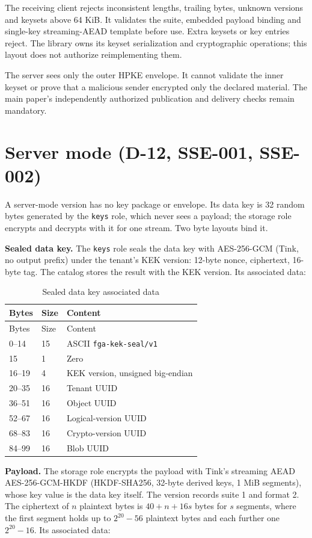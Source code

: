 \documentclass[11pt,a4paper]{article}
\newcommand{\code}[1]{{\small\nolinkurl{#1}}}
\begin{document}
The receiving client rejects inconsistent lengths, trailing bytes, unknown
versions and keysets above 64 KiB. It validates the suite, embedded payload
binding and single-key streaming-AEAD template before use. Extra keysets or key
entries reject. The library owns its keyset serialization and cryptographic
operations; this layout does not authorize reimplementing them.

The server sees only the outer HPKE envelope. It cannot validate the inner
keyset or prove that a malicious sender encrypted only the declared material.
The main paper's independently authorized publication and delivery checks
remain mandatory.

\section*{Server mode (D-12, SSE-001, SSE-002)}
A server-mode version has no key package or envelope. Its data key is 32
random bytes generated by the \code{keys} role, which never sees a payload;
the storage role encrypts and decrypts with it for one stream. Two byte
layouts bind it.

\textbf{Sealed data key.} The \code{keys} role seals the data key with
AES-256-GCM (Tink, no output prefix) under the tenant's KEK version: 12-byte
nonce, ciphertext, 16-byte tag. The catalog stores the result with the KEK
version. Its associated data:

\begin{longtable}{@{}P{0.15\textwidth}P{0.20\textwidth}P{0.55\textwidth}@{}}
\caption{Sealed data key associated data}\label{tab:sealaad}\\
\toprule Bytes & Size & Content\\\midrule\endfirsthead
\toprule Bytes & Size & Content\\\midrule{}--14 & 15 & ASCII \code{fga-kek-seal/v1}\\
15 & 1 & Zero\\
16--19 & 4 & KEK version, unsigned big-endian\\
20--35 & 16 & Tenant UUID\\
36--51 & 16 & Object UUID\\
52--67 & 16 & Logical-version UUID\\
68--83 & 16 & Crypto-version UUID\\
84--99 & 16 & Blob UUID\\
\bottomrule
\end{longtable}

\textbf{Payload.} The storage role encrypts the payload with Tink's
streaming AEAD AES-256-GCM-HKDF (HKDF-SHA256, 32-byte derived keys, 1 MiB
segments), whose key value is the data key itself. The version records suite
1 and format 2. The ciphertext of $n$ plaintext bytes is
$40 + n + 16s$ bytes for $s$ segments, where the first segment holds up to
$2^{20} - 56$ plaintext bytes and each further one $2^{20} - 16$. Its
associated data:
\end{document}
